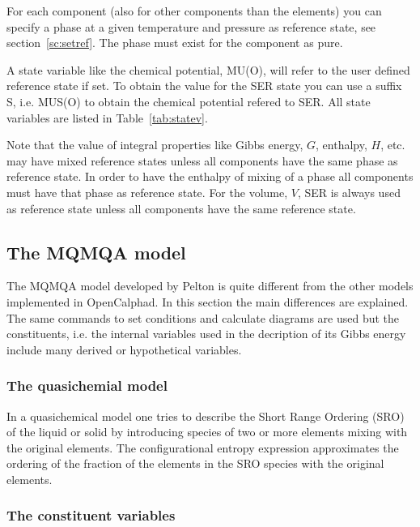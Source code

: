 \documentclass[11pt]{article}
\begin{document}
For each component (also for other components than the elements) you
can specify a phase at a given temperature and pressure as reference
state, see section~\ref{sc:setref}.  The phase must exist for the
component as pure.

A state variable like the chemical potential, MU(O), will refer to the
user defined reference state if set.  To obtain the value for the SER
state you can use a suffix S, i.e. MUS(O) to obtain the chemical
potential refered to SER.  All state variables are listed in
Table~\ref{tab:statev}.

Note that the value of integral properties like Gibbs energy, $G$,
enthalpy, $H$, etc. may have mixed reference states unless all
components have the same phase as reference state.  In order to have
the enthalpy of mixing of a phase all components must have that phase
as reference state.  For the volume, $V$, SER is always used as
reference state unless all components have the same reference state.

\hypertarget{Info MQMQA}{}
\subsection{The MQMQA model}\label{sc:mqmqa_special}

The MQMQA model developed by Pelton is quite different from the other
models implemented in OpenCalphad.  In this section the main
differences are explained.  The same commands to set conditions and
calculate diagrams are used but the constituents, i.e. the internal
variables used in the decription of its Gibbs energy include many
derived or hypothetical variables.

\subsubsection{The quasichemial model}\label{sc:quasichemical_model}

In a quasichemical model one tries to describe the Short Range
Ordering (SRO) of the liquid or solid by introducing species of two or
more elements mixing with the original elements.  The configurational
entropy expression approximates the ordering of the fraction of the
elements in the SRO species with the original elements.

\hypertarget{Info MQMQA const}{}
\subsubsection{The constituent variables}\label{sc:quadruplets}
\end{document}
